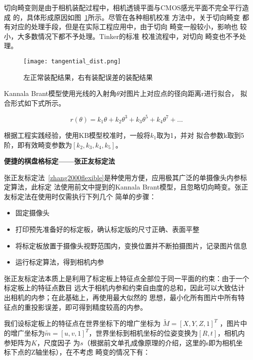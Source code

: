 切向畸变则是由于相机装配过程中，相机透镜平面与CMOS感光平面不完全平行造成
的，具体形成原因如图~\ref{fig:tangential_distort}所示。尽管在各种相机校准
方法中，关于切向畸变 都有对应的处理手段，但是在实际工程应用中，由于切向
畸变一般较小，影响也 较小，大多数情况下都不予处理。Tinker的标准
校准流程中，对切向 畸变也不予处理。

\begin{figure}[h] %
  \centering
  \texttt{[image: tangential\_dist.png]}
  \caption{左正常装配结果，右有装配误差的装配结果}
  \label{fig:tangential_distort}
\end{figure}

Kannala Brant模型使用光线的入射角$\theta$对图片上对应点的径向距离r进行拟合，
拟合形式如下式所示。

\begin{equation}
  r(\theta) = k_1\theta + k_2\theta^{3} + k_3\theta^{5} + k_4\theta^{7} + ...
\end{equation}

根据工程实践经验，使用KB模型校准时，一般将$k_1$取为1，并对
拟合参数{k}取到5阶，即有效畸变参数为$[k_2, k_3, k_4, k_5]$。

\noindent \textbf{便捷的棋盘格标定——张正友标定法}

张正友标定法~\ref{zhang2000flexible}是种使用方便，应用极其广泛的单摄像头内参标定算法，此标定
法使用前文中提到的Kannala Brant模型，且忽略切向畸变。张正友标定法在使用时仅需执行下列几个
简单的步骤：

\begin{itemize}
  \item 固定摄像头
  \item 打印预先准备好的标定板，确认标定版的尺寸正确、表面平整
  \item 将标定板放置于摄像头视野范围内，变换位置并不断拍摄图片，记录图片信息
  \item 运行标定算法，得到相机内参
\end{itemize}

张正友标定法本质上是利用了标定板上特征点全部位于同一平面的约束：由于一个标定板上的特征点数目
远大于相机内参和约束自由度的总和，因此可以大致估计出相机的内参；在此基础上，再使用最大似然的
思想，最小化所有图片中所有特征点的重投影误差，即可得到精度较高的内参。

我们设标定板上的特征点在世界坐标下的增广坐标为 $\tilde{M} = [X, Y, Z, 1]^T$ ，图片中的增广坐标为$\tilde{m} = [u, v, 1]^T$，世界坐标到相机坐标的位姿变换为$[R, t]$，相机内参矩阵为$K$，尺度因子
为$s$（根据前文单孔成像原理的介绍，这里的s即为相机坐标下点的Z轴坐标），在不考虑
畸变的情况下有：

